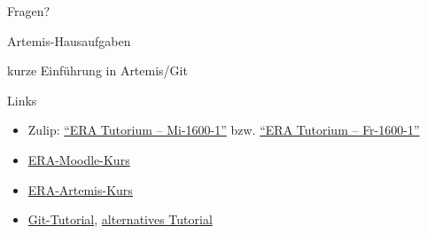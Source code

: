 \begin{frame}[c]{}{}
	\begin{center}
		\LARGE Fragen?
	\end{center}
\end{frame}

\begin{frame}[c]{Artemis-Hausaufgaben}{}
	\begin{center}
		\LARGE kurze Einführung in Artemis/Git
	\end{center}
\end{frame}

\begin{frame}[fragile, c]{Links}{}
	\begin{itemize}
		\item Zulip: \href{https://zulip.cit.tum.de/#narrow/channel/3254-ERA-Tutorium-.E2.80.93-Mi-1600-1}{\enquote{ERA Tutorium -- Mi-1600-1}}
		      bzw. \href{https://zulip.cit.tum.de/#narrow/channel/3266-ERA-Tutorium-.E2.80.93-Fr-1600-1}{\enquote{ERA Tutorium -- Fr-1600-1}}
		\item \href{https://www.moodle.tum.de/course/view.php?id=121343}{ERA-Moodle-Kurs}
		\item \href{https://artemis.tum.de/courses/596/exercises/21744}{ERA-Artemis-Kurs}
		\item \href{https://git-scm.com/docs/gittutorial}{Git-Tutorial}, \href{https://rogerdudler.github.io/git-guide/}{alternatives Tutorial}
	\end{itemize}
\end{frame}

\maketitle


